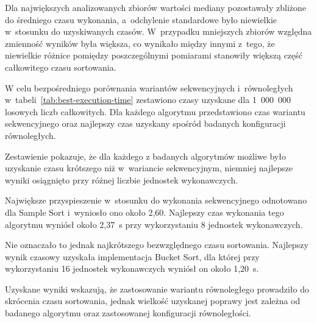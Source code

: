 Dla największych analizowanych zbiorów wartości mediany pozostawały zbliżone do średniego czasu wykonania, 
a~odchylenie standardowe było niewielkie w~stosunku do uzyskiwanych czasów.
W~przypadku mniejszych zbiorów względna zmienność wyników była większa, co wynikało między innymi z~tego, 
że niewielkie różnice pomiędzy poszczególnymi pomiarami stanowiły większą część całkowitego czasu sortowania.

W celu bezpośredniego porównania wariantów sekwencyjnych i~równoległych w~tabeli~\ref{tab:best-execution-time} 
zestawiono czasy uzyskane dla 1~000~000 losowych liczb całkowitych. 
Dla każdego algorytmu przedstawiono czas wariantu sekwencyjnego oraz najlepszy czas uzyskany spośród badanych konfiguracji równoległych.



Zestawienie pokazuje, że dla każdego z badanych algorytmów możliwe było uzyskanie czasu krótszego niż w~wariancie sekwencyjnym, 
niemniej najlepsze wyniki osiągnięto przy różnej liczbie jednostek wykonawczych. 

Największe przyspieszenie w~stosunku do wykonania sekwencyjnego odnotowano dla Sample Sort i~wyniosło ono około 2,60. 
Najlepszy czas wykonania tego algorytmu wyniósł około 2,37~s przy wykorzystaniu 8 jednostek wykonawczych.

Nie oznaczało to jednak najkrótszego bezwzględnego czasu sortowania. 
Najlepszy wynik czasowy uzyskała implementacja Bucket Sort, dla której przy wykorzystaniu 16 jednostek wykonawczych wyniósł on około 1,20~s.

Uzyskane wyniki wskazują, że zastosowanie wariantu równoległego prowadziło do skrócenia czasu sortowania, 
jednak wielkość uzyskanej poprawy jest zależna od badanego algorytmu oraz zastosowanej konfiguracji równoległości.